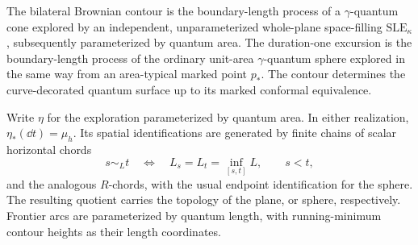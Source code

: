\begin{theorem}\label{enc:peanosphere}
The bilateral Brownian contour is the boundary-length process of a
$\gamma$-quantum cone explored by an independent, unparameterized
whole-plane space-filling $\mathrm{SLE}_{\kappa}$, subsequently
parameterized by quantum area.  The duration-one excursion is the
boundary-length process of the ordinary unit-area $\gamma$-quantum sphere
explored in the same way from an area-typical marked point $p_*$.
The contour determines the curve-decorated quantum surface up to its
marked conformal equivalence.

Write $\eta$ for the exploration parameterized by quantum area.
In either realization, $\eta_*(\dd t)=\mu_h$.  Its spatial identifications
are generated by finite chains of scalar horizontal chords
\begin{equation}\label{enc:chord-rule}
 s\sim_L t\quad\Longleftrightarrow\quad
 L_s=L_t=\inf_{[s,t]}L,
 \qquad s<t,
\end{equation}
and the analogous $R$-chords, with the usual endpoint identification for
the sphere.  The resulting quotient carries the topology of the plane,
or sphere, respectively.  Frontier arcs are parameterized by quantum
length, with running-minimum contour heights as their length coordinates.
\end{theorem}

